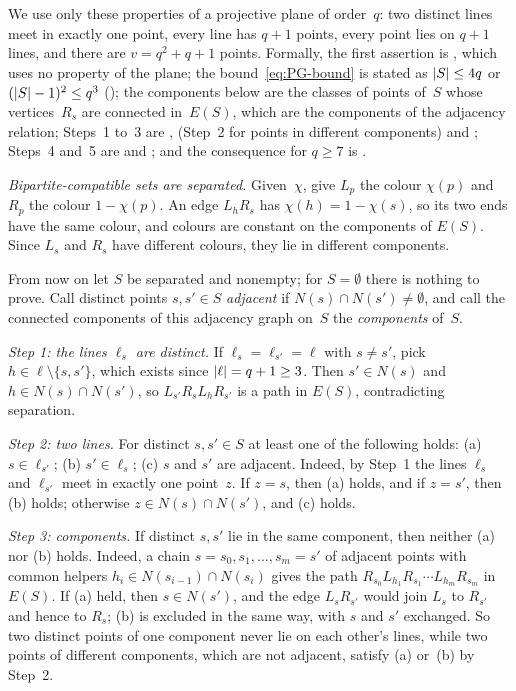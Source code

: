 \begin{outline}
We use only these properties of a projective plane of order~$q$: two distinct lines meet in exactly one point, every
line has $q+1$ points, every point lies on $q+1$ lines, and there are $v=q^2+q+1$ points. Formally, the first assertion
is , which uses no property of the plane; the bound~\eqref{eq:PG-bound}
is stated as $\lvert S \rvert\le4q$ or $(\lvert S \rvert-1)^2\le q^3$ (); the components below are the
classes of points of~$S$ whose vertices~$R_s$ are connected in~$E(S)$, which are the components of the adjacency
relation; Steps~1 to~3 are ,  (Step~2
for points in different components) and ; Steps~4 and~5 are
 and ; and the consequence for $q\ge7$ is
.

\emph{Bipartite-compatible sets are separated.} Given~$\chi$, give $L_p$ the colour $\chi(p)$ and $R_p$ the colour
$1-\chi(p)$. An edge $L_hR_s$ has $\chi(h)=1-\chi(s)$, so its two ends have the same colour, and colours are constant on
the components of $E(S)$. Since $L_s$ and $R_s$ have different colours, they lie in different components.

From now on let $S$ be separated and nonempty; for $S=\emptyset$ there is nothing to prove. Call distinct points
$s,s'\in S$ \emph{adjacent} if $N(s)\cap N(s')\ne\emptyset$, and call the connected components of this adjacency graph
on~$S$ the \emph{components} of~$S$.

\emph{Step 1: the lines $\ell_s$ are distinct.} If $\ell_s=\ell_{s'}=\ell$ with $s\ne s'$, pick
$h\in\ell\setminus\{s,s'\}$, which exists since $\lvert \ell \rvert=q+1\ge3$. Then $s'\in N(s)$ and $h\in N(s)\cap N(s')$, so
$L_{s'}R_sL_hR_{s'}$ is a path in $E(S)$, contradicting separation.

\emph{Step 2: two lines.} For distinct $s,s'\in S$ at least one of the following holds: (a) $s\in\ell_{s'}$;
(b) $s'\in\ell_s$; (c) $s$ and $s'$ are adjacent. Indeed, by Step~1 the lines $\ell_s$ and $\ell_{s'}$ meet in exactly
one point~$z$. If $z=s$, then (a) holds, and if $z=s'$, then (b) holds; otherwise $z\in N(s)\cap N(s')$, and (c) holds.

\emph{Step 3: components.} If distinct $s,s'$ lie in the same component, then neither (a) nor (b) holds. Indeed, a chain
$s=s_0,s_1,\dots,s_m=s'$ of adjacent points with common helpers $h_i\in N(s_{i-1})\cap N(s_i)$ gives the path
$R_{s_0}L_{h_1}R_{s_1}\cdots L_{h_m}R_{s_m}$ in $E(S)$. If (a) held, then $s\in N(s')$, and the edge $L_sR_{s'}$ would
join $L_s$ to $R_{s'}$ and hence to $R_s$; (b) is excluded in the same way, with $s$ and $s'$ exchanged. So two
distinct points of one component never lie on each other's lines, while two points of different components, which are
not adjacent, satisfy (a) or~(b) by Step~2.


\end{outline}
